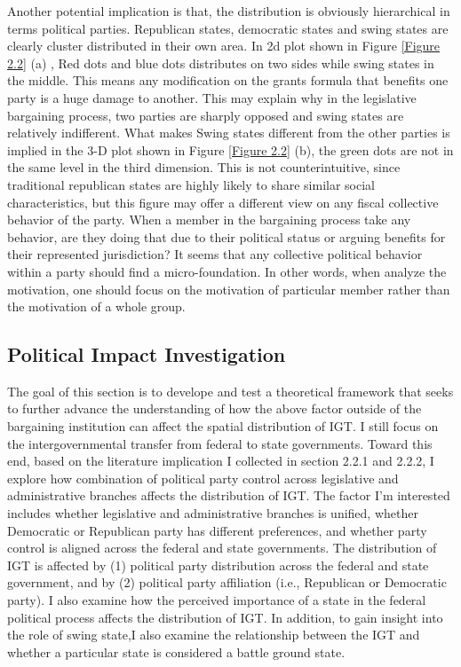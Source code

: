 Another potential implication is that, the distribution is obviously hierarchical in terms political parties. Republican states, democratic states and swing states are clearly cluster distributed in their own area. In 2d plot shown in Figure \ref*{Figure 2.2} (a) , Red dots and blue dots distributes on two sides while swing states in the middle. This means any modification on the grants formula that benefits one party is a huge damage to another. This may explain why in the legislative bargaining process, two parties are sharply opposed and swing states are relatively indifferent. What makes Swing states different from the other parties is implied in the 3-D plot shown in Figure \ref*{Figure 2.2} (b), the green dots are not in the same level in the third dimension. This is not counterintuitive, since traditional republican states are highly likely to share similar social characteristics, but this figure may offer a different view on any fiscal collective behavior of the party. When a member in the bargaining process take any behavior, are they doing that due to their political status or arguing benefits for their represented jurisdiction? It seems that any collective political behavior within a party should find a micro-foundation. In other words, when analyze the motivation, one should focus on the motivation of particular member rather than the motivation of a whole group.

\subsection{Political Impact Investigation}

The goal of this section is to  develope and test a theoretical framework that seeks to further advance the understanding of how the above factor outside of the bargaining institution can affect the spatial distribution of IGT. I still focus on the intergovernmental transfer from federal to state governments. Toward this end, based on the literature implication I collected in section 2.2.1 and 2.2.2, I explore how combination of political party control across legislative and administrative branches affects the distribution of IGT. The factor I'm interested includes whether legislative and administrative branches is unified, whether Democratic or Republican party has different preferences, and whether party control is aligned across the federal and state governments. The distribution of IGT is affected by (1) political party distribution across the federal and state government, and by (2) political party affiliation (i.e., Republican or Democratic party). I also examine how the perceived importance of a state in the federal political process affects the distribution of IGT. In addition, to gain insight into the role of swing state,I also examine the relationship between the IGT and whether a particular state is considered a battle ground state.

